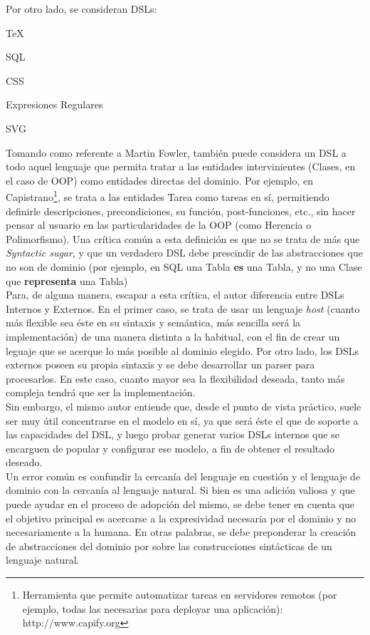 \documentclass[10pt]{article}
\numberwithin{equation}{section}
\numberwithin{figure}{section}
\numberwithin{table}{section}
\begin{document}
Por otro lado, se consideran DSLs:
\begin{list}{*}{}
  \item  \TeX{}
  \item SQL
  \item CSS
  \item Expresiones Regulares
  \item SVG
\end{list}

Tomando como referente a Martin Fowler, también puede considera un DSL a todo aquel lenguaje que permita tratar a las entidades intervinientes (Clases, en el caso de OOP) como entidades directas del dominio. Por ejemplo, en Capistrano\footnote{Herramienta que permite automatizar tareas en servidores remotos (por ejemplo, todas las necesarias para deployar una aplicación): http://www.capify.org}, se trata a las entidades Tarea como tareas en sí, permitiendo definirle descripciones, precondiciones, su función, post-funciones, etc., sin hacer pensar al usuario en las particularidades de la OOP (como Herencia o Polimorfismo). Una crítica común a esta definición es que no se trata de más que \textit{Syntactic sugar}, y que un verdadero DSL debe prescindir de las abstracciones que no son de dominio (por ejemplo, en SQL una Tabla \textbf{es} una Tabla, y no una Clase que \textbf{representa} una Tabla)\\

Para, de alguna manera, escapar a esta crítica, el autor diferencia entre DSLs Internos y Externos\cite{Fow:01}. En el primer caso, se trata de usar un lenguaje \textit{host} (cuanto más flexible sea éste en su sintaxis y semántica, más sencilla será la implementación) de una manera distinta a la habitual, con el fin de crear un leguaje que se acerque lo más posible al dominio elegido. Por otro lado, los DSLs externos poseen su propia sintaxis y se debe desarrollar un parser para procesarlos. En este caso, cuanto mayor sea la flexibilidad deseada, tanto más compleja tendrá que ser la implementación.\\

Sin embargo, el mismo autor entiende que, desde el punto de vista práctico, suele ser muy útil concentrarse en el modelo en sí, ya que será éste el que de soporte a las capacidades del DSL, y luego probar generar varios DSLs internos que se encarguen de popular y configurar ese modelo, a fin de obtener el resultado deseado.\cite{Fow:03}\\

Un error común es confundir la cercanía del lenguaje en cuestión y el lenguaje de dominio con la cercanía al lenguaje natural. Si bien es una adición valiosa y que puede ayudar en el proceso de adopción del mismo, se debe tener en cuenta que el objetivo principal es acercarse a la expresividad necesaria por el dominio y no necesariamente a la humana. En otras palabras, se debe preponderar la creación de abstracciones del dominio por sobre las construcciones sintácticas de un lenguaje natural.
\end{document}
